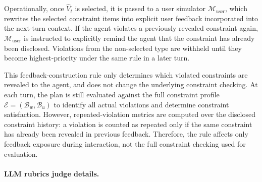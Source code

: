 \documentclass{llmxive}
\begin{document}
Operationally, once \(\widehat{V}_t\) is selected, it is passed to a user simulator \(\mathcal{M}_{\mathrm{user}}\), which rewrites the selected constraint items into explicit user feedback incorporated into the next-turn context. 
If the agent violates a previously revealed constraint again, \(\mathcal{M}_{\mathrm{user}}\) is instructed to explicitly remind the agent that the constraint has already been disclosed. 
Violations from the non-selected type are withheld until they become highest-priority under the same rule in a later turn.

This feedback-construction rule only determines which violated constraints are revealed to the agent, and does not change the underlying constraint checking. At each turn, the plan is still evaluated against the full constraint profile $\mathcal{E}=(\mathcal{B}_w,\mathcal{B}_u)$ to identify all actual violations and determine constraint satisfaction. However, repeated-violation metrics are computed over the disclosed constraint history: a violation is counted as repeated only if the same constraint has already been revealed in previous feedback. Therefore, the rule affects only feedback exposure during interaction, not the full constraint checking used for evaluation.



\paragraph{LLM rubrics judge details.}
\end{document}
